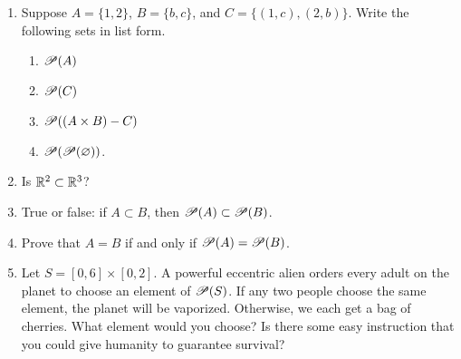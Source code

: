 \probsec{~\ref{sec:power-set}}
\begin{enumerate}
    \item Suppose $A = \{1, 2\}$, $B = \{b,c\}$, and $C = \{(1,c), (2,b)\}$. Write the following sets in list form.
  \begin{enumerate}
      \item $\mathscr{P}(A)$
      \item $\mathscr{P}(C)$
      \item $\mathscr{P}((A \times B) - C)$
      \item $\mathscr{P}(\mathscr{P}(\varnothing))$.
  \end{enumerate}

    \item Is $\mathbb{R}^2 \subset \mathbb{R}^3$?

    \item True or false: if $A \subset B$, then $\mathscr{P}(A) \subset \mathscr{P}(B)$.

    \item Prove that $A = B$ if and only if $\mathscr{P}(A) = \mathscr{P}(B)$.

    \item Let $S = [0,6] \times [0,2]$. A powerful eccentric alien orders every adult on the planet to choose an element of $\mathscr{P}(S)$. If any two people choose the same element, the planet will be vaporized. Otherwise, we each get a bag of cherries. What element would you choose? Is there some easy instruction that you could give humanity to guarantee survival?
\end{enumerate}
